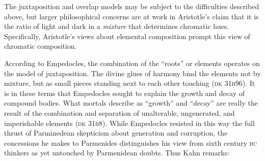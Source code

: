 The juxtaposition and overlap models may be subject to the difficulties described above, but larger philosophical concerns are at work in Aristotle's claim that it is the ratio of light and dark in a \emph{mixture} that determines chromatic hues. Specifically, Aristotle's views about elemental composition prompt this view of chromatic composition.

According to Empedocles, the combination of the ``roots'' or elements operates on the model of juxtaposition. The divine glues of harmony bind the elements not by mixture, but as small pieces standing next to each other touching (\textsc{dk} 31\textsc{b}96). It is in these terms that Empedocles sought to explain the growth and decay of compound bodies. What mortals describe as ``growth'' and ``decay'' are really the result of the combination and separation of unalterable, ungenerated, and imperishable elements (\textsc{dk} 31\textsc{b}8). 
While Empedocles resisted in this way the full thrust of Parminedean skepticism about generation and corruption, the concessions he makes to Parmenides distinguishes his view from sixth century \textsc{bc} thinkers as yet untouched by Parmenidean doubts. Thus Kahn remarks:
